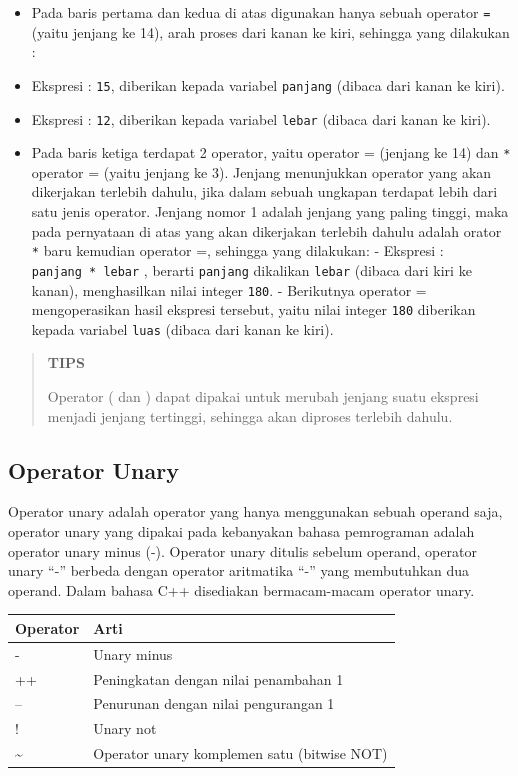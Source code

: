 \begin{itemize}

\item
 Pada baris pertama dan kedua di atas digunakan hanya sebuah operator
 \texttt{=} (yaitu jenjang ke 14), arah proses dari kanan ke kiri,
 sehingga yang dilakukan :
\item
 Ekspresi : \texttt{15}, diberikan kepada variabel \texttt{panjang}
 (dibaca dari kanan ke kiri).
\item
 Ekspresi : \texttt{12}, diberikan kepada variabel \texttt{lebar}
 (dibaca dari kanan ke kiri).
\item
 Pada baris ketiga terdapat 2 operator, yaitu operator = (jenjang
 ke 14) dan \texttt{*} operator = (yaitu jenjang ke 3).
 Jenjang menunjukkan operator yang akan dikerjakan terlebih dahulu,
 jika dalam sebuah ungkapan terdapat lebih dari satu jenis operator.
 Jenjang nomor 1 adalah jenjang yang paling tinggi, maka pada
 pernyataan di atas yang akan dikerjakan terlebih dahulu adalah orator
 \texttt{*} baru kemudian operator =, sehingga yang dilakukan:
 - Ekspresi : \texttt{panjang\ *\ lebar} , berarti \texttt{panjang}
 dikalikan \texttt{lebar} (dibaca dari kiri ke kanan), menghasilkan
 nilai integer \texttt{180}. - Berikutnya operator = mengoperasikan
 hasil ekspresi tersebut, yaitu nilai integer \texttt{180} diberikan
 kepada variabel \texttt{luas} (dibaca dari kanan ke kiri).
\end{itemize}

\begin{quotation}
{\LARGE {}} \textbf{TIPS}

Operator
( dan ) dapat dipakai untuk merubah jenjang suatu ekspresi
menjadi jenjang tertinggi, sehingga akan diproses terlebih dahulu.
\end{quotation}


\subsection{Operator Unary}\label{a-operator-unary}

Operator unary adalah operator yang hanya menggunakan sebuah operand
saja, operator unary yang dipakai pada kebanyakan bahasa pemrograman
adalah operator unary minus (-). Operator unary ditulis sebelum operand,
operator unary ``-'' berbeda dengan operator aritmatika ``-'' yang
membutuhkan dua operand. Dalam bahasa C++ disediakan bermacam-macam
operator unary.

\begin{longtable}[]{@{}ll@{}}
\toprule
Operator & Arti\tabularnewline
\midrule
\endhead
- & Unary minus\tabularnewline
++ & Peningkatan dengan nilai penambahan 1\tabularnewline
-- & Penurunan dengan nilai pengurangan 1\tabularnewline
! & Unary not\tabularnewline
\textasciitilde{} & Operator unary komplemen satu (bitwise
NOT)\tabularnewline
\bottomrule
\end{longtable}

